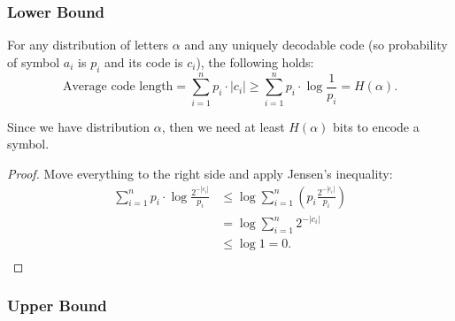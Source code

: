\subsubsection{Lower Bound}

\begin{theorem}[Shanon]
    For any distribution of letters $\alpha$ and any uniquely decodable code (so probability of symbol $a_i$ is $p_i$ and its code is $c_i$), the following holds:
    \[
        \text{Average code length} =  \sum _{ i = 1 }^{ n } p_{i} \cdot |c_{i}| \ge \sum _{ i = 1 }^{ n } p_{i} \cdot \log \frac{1}{p_{i}} = H(\alpha).
    \]
\end{theorem}

Since we have distribution $\alpha$, then we need at least $H(\alpha)$ bits to encode a symbol. 
\begin{proof}
    Move everything to the right side and apply Jensen's inequality:
    \begin{align*}
        \sum _{ i = 1 }^{ n } p_{i} \cdot \log \frac{2^{-|c_{i}|}}{p_{i}}
        &\le \log \sum _{ i = 1 }^{ n } \left( p_{i} \frac{2^{-|c_{i}|}}{p_{i}} \right)  \\
        &= \log \sum _{ i = 1 }^{ n } 2^{-|c_{i}|} \\
        &\le \log 1 = 0. \\
    \end{align*}
\end{proof}

\subsubsection{Upper Bound}

